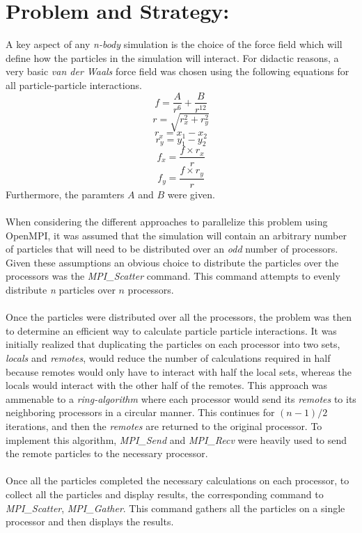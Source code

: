 \documentclass{article}
\begin{document}
\section*{Problem and Strategy:}
A key aspect of any \textit{n-body} simulation is the choice
of the force field which will define how the particles in the 
simulation will interact.  For didactic reasons, a very basic
\textit{van der Waals} force field was chosen using the following
equations for all particle-particle interactions.
\[
f = \frac{A}{r^6} + \frac{B}{r^{12}}
\]
\[
r = \sqrt{r_x^2 + r_y^2}
\]
\[
r_x = x_1 - x_2
\]
\[
r_y = y_1 - y_2
\]
\[
f_x = \frac{f\times r_x}{r}
\]
\[
f_y = \frac{f\times r_y}{r}
\]
Furthermore, the paramters $A$ and $B$ were given.\\\\
When considering the different approaches to parallelize this
problem using OpenMPI, it was assumed that the simulation
will contain an arbitrary number of particles that will need
to be distributed over an \textit{odd} number of processors.
Given these assumptions an obvious choice to distribute the 
particles over the processors was the \textit{MPI\_Scatter}
command.  This command attempts to evenly distribute
\textit{n} particles over $n$ processors.\\\\
Once the particles were distributed over all the processors,
the problem was then to determine an efficient way to
calculate particle particle interactions.   It was initially
realized that duplicating the particles on each processor into
two sets, \textit{locals} and \textit{remotes}, would reduce
the number of calculations required in half because remotes
would only have to interact with half the local sets, whereas
the locals would interact with the other half of the remotes.
This approach was ammenable to a \textit{ring-algorithm}
where each processor would send its \textit{remotes} to
its neighboring processors in a circular manner.  This 
continues for $(n-1)/2$ iterations, and then the \textit{remotes}
are returned to the original processor.  To implement this algorithm,
\textit{MPI\_Send} and \textit{MPI\_Recv} were heavily used to
send the remote particles to the necessary processor.\\\\
Once all the particles completed the necessary calculations on
each processor, to collect all the particles and display results,
the corresponding command to \textit{MPI\_Scatter}, \textit{MPI\_Gather}.
This command gathers all the particles on a single processor
and then displays the results. 
\newpage
\end{document}
